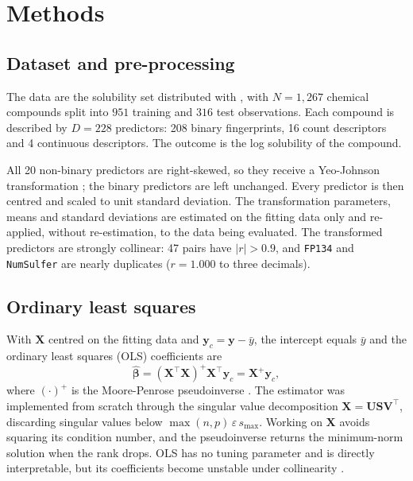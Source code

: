 \documentclass[conference]{IEEEtran}
\begin{document}
\section{Methods}
\label{sec:methods}

\subsection{Dataset and pre-processing}
\label{subsec:dataset}

The data are the solubility set distributed with \cite{kuhn2013}, with
$N = 1{,}267$ chemical compounds split into $951$ training and $316$
test observations. Each compound is described by $D = 228$ predictors:
208 binary fingerprints, 16 count descriptors and 4 continuous
descriptors. The outcome is the log solubility of the compound.

All 20 non-binary predictors are right-skewed, so they receive a
Yeo-Johnson transformation \cite{yeo2000}; the binary predictors are
left unchanged. Every predictor is then centred and scaled to unit
standard deviation. The transformation parameters, means and standard
deviations are estimated on the fitting data only and re-applied,
without re-estimation, to the data being evaluated. The transformed
predictors are strongly collinear: 47 pairs have $|r| > 0.9$, and
\texttt{FP134} and \texttt{NumSulfer} are nearly duplicates
($r = 1.000$ to three decimals).

\subsection{Ordinary least squares}
\label{subsec:ols}

With $\mathbf{X}$ centred on the fitting data and
$\mathbf{y}_c = \mathbf{y} - \bar{y}$, the intercept equals $\bar{y}$
and the ordinary least squares (OLS) coefficients are
\begin{equation}
\hat{\boldsymbol{\beta}} =
(\mathbf{X}^{\top}\mathbf{X})^{+}\mathbf{X}^{\top}\mathbf{y}_c =
\mathbf{X}^{+}\mathbf{y}_c,
\label{eq:ols}
\end{equation}
where $(\cdot)^{+}$ is the Moore-Penrose pseudoinverse
\cite{golub2013}. The estimator was implemented from scratch through
the singular value decomposition
$\mathbf{X} = \mathbf{U}\mathbf{S}\mathbf{V}^{\top}$, discarding
singular values below $\max(n,p)\,\varepsilon\,s_{\max}$. Working on
$\mathbf{X}$ avoids squaring its condition number, and the
pseudoinverse returns the minimum-norm solution when the rank drops.
OLS has no tuning parameter and is directly interpretable, but its
coefficients become unstable under collinearity \cite{hastie2009}.
\end{document}
